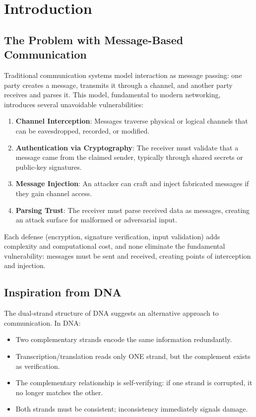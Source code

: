 \documentclass[11pt,a4paper]{article}
\theoremstyle{definition}
\begin{document}
\section{Introduction}

\subsection{The Problem with Message-Based Communication}

Traditional communication systems model interaction as message passing: one party creates a message, transmits it through a channel, and another party receives and parses it. This model, fundamental to modern networking, introduces several unavoidable vulnerabilities:

\begin{enumerate}
\item \textbf{Channel Interception}: Messages traverse physical or logical channels that can be eavesdropped, recorded, or modified.
\item \textbf{Authentication via Cryptography}: The receiver must validate that a message came from the claimed sender, typically through shared secrets or public-key signatures.
\item \textbf{Message Injection}: An attacker can craft and inject fabricated messages if they gain channel access.
\item \textbf{Parsing Trust}: The receiver must parse received data as messages, creating an attack surface for malformed or adversarial input.
\end{enumerate}

Each defense (encryption, signature verification, input validation) adds complexity and computational cost, and none eliminate the fundamental vulnerability: messages must be sent and received, creating points of interception and injection.

\subsection{Inspiration from DNA}

The dual-strand structure of DNA suggests an alternative approach to communication. In DNA:
\begin{itemize}
\item Two complementary strands encode the same information redundantly.
\item Transcription/translation reads only ONE strand, but the complement exists as verification.
\item The complementary relationship is self-verifying: if one strand is corrupted, it no longer matches the other.
\item Both strands must be consistent; inconsistency immediately signals damage.
\end{itemize}
\end{document}
